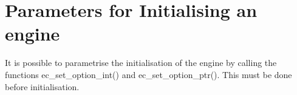%
% 
% 
% 
% 

\chapter{Parameters for Initialising an {\eclipse} engine}

\label{chapecoptions}
It is possible to parametrise the initialisation of the \eclipse
engine by calling the functions ec_set_option_int() and ec_set_option_ptr().
This must be done before initialisation.

